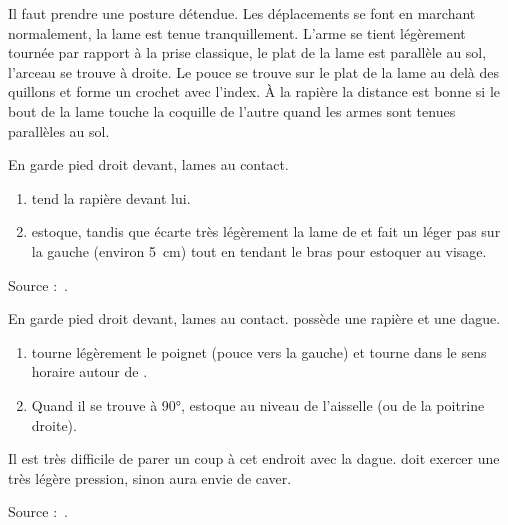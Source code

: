 Il faut prendre une posture détendue. Les déplacements se font en marchant normalement, la lame est tenue tranquillement.
L'arme se tient légèrement tournée par rapport à la prise classique, le plat de la lame est parallèle au sol, l'arceau se trouve à droite. Le pouce se trouve sur le plat de la lame au delà des quillons et forme un crochet avec l'index.
À la rapière la distance est bonne si le bout de la lame touche la coquille de l'autre quand les armes sont tenues parallèles au sol.

\begin{technique}

En garde pied droit devant, lames au contact.

\begin{enumerate}
	\item \A tend la rapière devant lui.
	\item \A estoque, tandis que \D écarte très légèrement la lame de \A et fait un léger pas sur la gauche (environ \SI{5}{cm}) tout en tendant le bras pour estoquer au visage.
\end{enumerate}

Source :~\cite{guidoux:dijon:thibault:2015}.

\end{technique}


\begin{technique}

En garde pied droit devant, lames au contact.
\D possède une rapière et une dague.

\begin{enumerate}
	\item \A tourne légèrement le poignet (pouce vers la gauche) et tourne dans le sens horaire autour de \D.
	\item Quand il se trouve à 90°, \A estoque \D au niveau de l'aisselle (ou de la poitrine droite).
\end{enumerate}

Il est très difficile de parer un coup à cet endroit avec la dague.
\A doit exercer une très légère pression, sinon \D aura envie de caver.

Source :~\cite{guidoux:dijon:thibault:2015}.

\end{technique}


